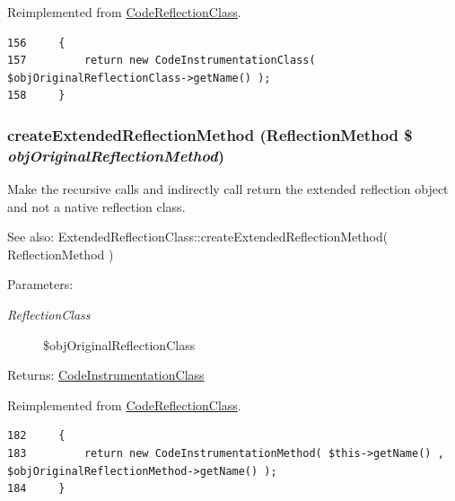 Reimplemented from \hyperlink{class_code_reflection_class_6b56ec198bc6a5b5a72076e4e7c19e29}{CodeReflectionClass}.

\begin{Code}\begin{verbatim}156     {
157         return new CodeInstrumentationClass( $objOriginalReflectionClass->getName() );
158     }
\end{verbatim}
\end{Code}


\hypertarget{class_code_instrumentation_class_ec7c1d4b204b6e3a6291d3b867afb688}{
\subsubsection[{createExtendedReflectionMethod}]{\setlength{\rightskip}{0pt plus 5cm}createExtendedReflectionMethod (ReflectionMethod \$ {\em objOriginalReflectionMethod})}}
\label{class_code_instrumentation_class_ec7c1d4b204b6e3a6291d3b867afb688}


Make the recursive calls and indirectly call return the extended reflection object and not a native reflection class.

\begin{Desc}
\item[See also:]ExtendedReflectionClass::createExtendedReflectionMethod( ReflectionMethod ) \end{Desc}
\begin{Desc}
\item[Parameters:]
\begin{description}
\item[{\em ReflectionClass}]\$objOriginalReflectionClass \end{description}
\end{Desc}
\begin{Desc}
\item[Returns:]\hyperlink{class_code_instrumentation_class}{CodeInstrumentationClass} \end{Desc}


Reimplemented from \hyperlink{class_code_reflection_class_ec7c1d4b204b6e3a6291d3b867afb688}{CodeReflectionClass}.

\begin{Code}\begin{verbatim}182     {
183         return new CodeInstrumentationMethod( $this->getName() , $objOriginalReflectionMethod->getName() );
184     }
\end{verbatim}
\end{Code}


